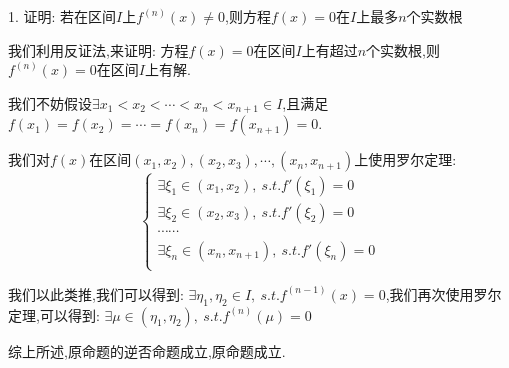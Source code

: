 1. 证明:  若在区间$I$上$f^{(n)}(x)\neq 0$,则方程$f(x)=0$在$I$上最多$n$个实数根
\begin{solution}

	我们利用反证法,来证明:  方程$f(x)=0$在区间$I$上有超过$n$个实数根,则$f^{(n)}(x)=0$在区间$I$上有解.
	
	我们不妨假设$\exists x_{1}<x_{2}<\cdots<x_{n}<x_{n+1}\in I$,且满足$f(x_{1})=f(x_{2})=\cdots=f(x_{n})=f(x_{n+1})=0$.
	
	我们对$f(x)$在区间$(x_{1},x_{2}),(x_{2},x_{3}),\cdots,(x_{n},x_{n+1})$上使用罗尔定理:  
	$$\left\lbrace
	\begin{array}{l}
		\exists \xi_{1}\in(x_{1},x_{2}),\ s.t. f'(\xi_{1})=0\\
		\exists \xi_{2}\in(x_{2},x_{3}),\ s.t. f'(\xi_{2})=0\\
		\cdots\cdots\\
		\exists \xi_{n}\in(x_{n},x_{n+1}),\ s.t. f'(\xi_{n})=0\\	
	\end{array}
	\right. $$
	
	我们以此类推,我们可以得到:  $\exists\eta_{1},\eta_{2}\in I,\ s.t. f^{(n-1)}(x)=0$,我们再次使用罗尔定理,可以得到:  
	$\exists \mu\in(\eta_{1},\eta_{2}),\ s.t. f^{(n)}(\mu)=0$
	
	综上所述,原命题的逆否命题成立,原命题成立.
\end{solution}

